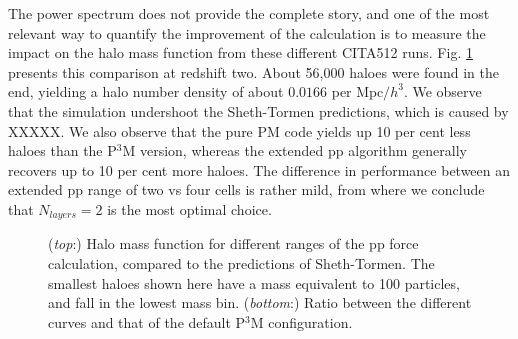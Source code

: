 
The power spectrum does not provide the complete story, and one of the most relevant way to quantify the improvement of the calculation is to measure the impact on the halo mass function from these different CITA512 runs. Fig. \ref{fig:MassFunction_extpp} presents this comparison at redshift two. About 56,000 haloes were found in the end, yielding a halo number density of about $0.0166$ per $\mbox{Mpc/$h$}^{3}$. 
We observe that the simulation undershoot the Sheth-Tormen predictions, which is caused by XXXXX. 
We also observe that the pure PM code yields up 10 per cent less haloes than the P$^{3}$M version, 
whereas the extended pp algorithm generally recovers  up to 10 per cent more haloes.
The difference in performance between an extended pp  range of two vs four cells is rather mild, from where
we conclude that $N_{layers} = 2$ is the most optimal choice.


\begin{figure}
  \begin{center}
  \caption{ ({\it top}:) Halo mass function for different ranges of the pp force calculation, compared to the predictions of Sheth-Tormen. 
  The smallest haloes shown here have a mass equivalent to 100 particles, and fall in the lowest mass bin.
  ({\it bottom}:) Ratio between the different curves and that of the default P$^3$M configuration.}
    \label{fig:MassFunction_extpp}
  \end{center}
\end{figure}

